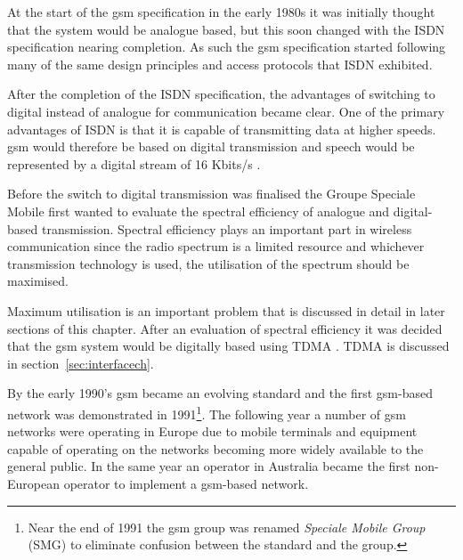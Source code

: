 At the start of the \gls{gsm} specification in the early 1980s it was initially thought that the system would be analogue based, but this soon changed with the \gls{ISDN} specification nearing completion\cite{GSM92}. As such the \gls{gsm} specification started following many of the same design principles and access protocols that \gls{ISDN} exhibited\cite{GSM92}.

After the completion of the \gls{ISDN} specification, the advantages of switching to digital instead of analogue for communication became clear\cite{GSM92}. One of the primary advantages of \gls{ISDN} is that it is capable of transmitting data at higher speeds\cite{GSM92}. \gls{gsm} would therefore be based on digital transmission and speech would be represented by a digital stream of 16 Kbits/s \cite{GSM92}.

Before the switch to digital transmission was finalised the Groupe Speciale Mobile first wanted to evaluate the spectral efficiency of analogue and digital-based transmission\cite{GSM92}. Spectral efficiency plays an important part in wireless communication since the radio spectrum is a limited resource and whichever transmission technology is used, the utilisation of the spectrum should be maximised\cite{GSM92}. 

Maximum utilisation is an important problem that is discussed in detail in later sections of this chapter. After an evaluation of spectral efficiency it was decided that the \gls{gsm} system would be digitally based using \gls{TDMA} \cite{GSM92,GSMSysEngin}. \gls{TDMA} is discussed in section~\ref{sec:interfacech}.

By the early 1990’s \gls{gsm} became an evolving standard and the first \gls{gsm}-based network was demonstrated in 1991\footnote{Near the end of 1991 the \gls{gsm} group was renamed \emph{Speciale Mobile Group} (SMG) to eliminate confusion between the standard and the group.}\cite{GSMArchitectureProtocolsServices,Eisenblatter}. The following year a number of \gls{gsm} networks were operating in Europe due to mobile terminals and equipment capable of operating on the networks becoming more widely available to the general public\cite{GSM92,Eisenblatter}. In the same year an operator in Australia became the first non-European operator to implement a \gls{gsm}-based network\cite{Eisenblatter}.

